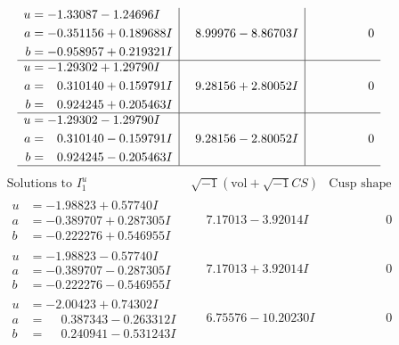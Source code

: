 \documentclass[1p]{elsarticle_modified}
\theoremstyle{definition}
\newcommand{\I}{\sqrt{-1}}
\begin{document}
$$\begin{array}{c|c|c}
\begin{aligned}
u &= -1.33087 - 1.24696 I \\
a &= -0.351156 + 0.189688 I \\
b &= -0.958957 + 0.219321 I\end{aligned}
 & \phantom{-}8.99976 - 8.86703 I & \phantom{-0.000000 } 0 \\ \hline\begin{aligned}
u &= -1.29302 + 1.29790 I \\
a &= \phantom{-}0.310140 + 0.159791 I \\
b &= \phantom{-}0.924245 + 0.205463 I\end{aligned}
 & \phantom{-}9.28156 + 2.80052 I & \phantom{-0.000000 } 0 \\ \hline\begin{aligned}
u &= -1.29302 - 1.29790 I \\
a &= \phantom{-}0.310140 - 0.159791 I \\
b &= \phantom{-}0.924245 - 0.205463 I\end{aligned}
 & \phantom{-}9.28156 - 2.80052 I & \phantom{-0.000000 } 0\\
 \hline 
 \end{array}$$\newpage$$\begin{array}{c|c|c}  
\text{Solutions to }I^u_{1}& \I (\text{vol} + \sqrt{-1}CS) & \text{Cusp shape}\\
 \hline 
\begin{aligned}
u &= -1.98823 + 0.57740 I \\
a &= -0.389707 + 0.287305 I \\
b &= -0.222276 + 0.546955 I\end{aligned}
 & \phantom{-}7.17013 - 3.92014 I & \phantom{-0.000000 } 0 \\ \hline\begin{aligned}
u &= -1.98823 - 0.57740 I \\
a &= -0.389707 - 0.287305 I \\
b &= -0.222276 - 0.546955 I\end{aligned}
 & \phantom{-}7.17013 + 3.92014 I & \phantom{-0.000000 } 0 \\ \hline\begin{aligned}
u &= -2.00423 + 0.74302 I \\
a &= \phantom{-}0.387343 - 0.263312 I \\
b &= \phantom{-}0.240941 - 0.531243 I\end{aligned}
 & \phantom{-}6.75576 - 10.20230 I & \phantom{-0.000000 } 0 \\ \hline\begin{aligned}

\end{aligned}
\end{array}$$
\end{document}
